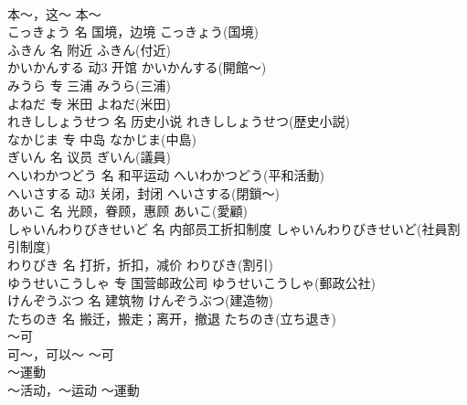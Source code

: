 \documentclass[8pt]{extreport}
\begin{document}
\begin{CJK}{UTF8}{min}
\\	本～，这～	本～	
\\	こっきょう	名	国境，边境	こっきょう(国境)	
\\	ふきん	名	附近	ふきん(付近)	
\\	かいかんする	动3	开馆	かいかんする(開館～)	
\\	みうら	专	三浦	みうら(三浦)	
\\	よねだ	专	米田	よねだ(米田)	
\\	れきししょうせつ	名	历史小说	れきししょうせつ(歴史小説)	
\\	なかじま	专	中岛	なかじま(中島)	
\\	ぎいん	名	议员	ぎいん(議員)	
\\	へいわかつどう	名	和平运动	へいわかつどう(平和活動)	
\\	へいさする	动3	关闭，封闭	へいさする(閉鎖～)	
\\	あいこ	名	光顾，眷顾，惠顾	あいこ(愛顧)	
\\	しゃいんわりびきせいど	名	内部员工折扣制度	しゃいんわりびきせいど(社員割引制度)	
\\	わりびき	名	打折，折扣，减价	わりびき(割引)	
\\	ゆうせいこうしゃ	专	国营邮政公司	ゆうせいこうしゃ(郵政公社)	
\\	けんぞうぶつ	名	建筑物	けんぞうぶつ(建造物)	
\\	たちのき	名	搬迁，搬走；离开，撤退	たちのき(立ち退き)	
\\	～可	
\\	可～，可以～	～可	
\\	～運動	
\\	～活动，～运动	～運動	
\end{CJK}
\end{document}
